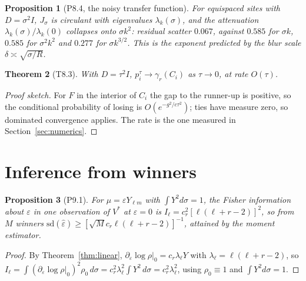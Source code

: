 \documentclass[11pt]{article}
\newtheorem{theorem}{Theorem}[section]
\newtheorem{proposition}[theorem]{Proposition}
\theoremstyle{definition}
\begin{document}
\begin{proposition}[\textsf{P8.4}, the noisy transfer function]\label{prop:transfer}
For equispaced sites with $D=\sigma^{2}I$, $J_{\sigma}$ is circulant with
eigenvalues $\lambda_{k}(\sigma)$, and the attenuation
$\lambda_{k}(\sigma)/\lambda_{k}(0)$ collapses onto $\sigma k^{2}$: residual
scatter $0.067$, against $0.585$ for $\sigma k$, $0.585$ for $\sigma^{2}k^{2}$
and $0.277$ for $\sigma k^{3/2}$. This is the exponent predicted by the blur
scale $\delta\asymp\sqrt{\sigma/R}$.
\end{proposition}

\begin{theorem}[\textsf{T8.3}]\label{thm:tau}
With $D=\tau^{2}I$, $p^{\tau}_{i}\to\gamma_{r}(C_{i})$ as $\tau\to0$, at rate
$O(\tau)$.
\end{theorem}
\begin{proof}[Proof sketch]
For $F$ in the interior of $C_{i}$ the gap to the runner-up is positive, so
the conditional probability of losing is $O(e^{-g^{2}/c\tau^{2}})$; ties have
measure zero, so dominated convergence applies. The rate is the one measured
in Section~\ref{sec:numerics}.
\end{proof}

\section{Inference from winners}\label{sec:stat}

\begin{proposition}[\textsf{P9.1}]\label{prop:fisher}
For $\mu=\varepsilon Y_{\ell m}$ with $\int Y^{2}d\sigma=1$, the Fisher
information about $\varepsilon$ in one observation of $V^{*}$ at
$\varepsilon=0$ is $I_{\ell}=c_{r}^{2}[\ell(\ell+r-2)]^{2}$, so from $M$
winners $\mathrm{sd}(\hat\varepsilon)\ge[\sqrt M c_{r}\ell(\ell+r-2)]^{-1}$,
attained by the moment estimator.
\end{proposition}
\begin{proof}
By Theorem~\ref{thm:linear}, $\partial_{\varepsilon}\log\rho|_{0}
=c_{r}\lambda_{\ell}Y$ with $\lambda_{\ell}=\ell(\ell+r-2)$, so
$I_{\ell}=\int(\partial_{\varepsilon}\log\rho|_{0})^{2}\rho_{0}\,d\sigma
=c_{r}^{2}\lambda_{\ell}^{2}\int Y^{2}\,d\sigma=c_{r}^{2}\lambda_{\ell}^{2}$,
using $\rho_{0}\equiv1$ and $\int Y^{2}d\sigma=1$.
\end{proof}
\end{document}
